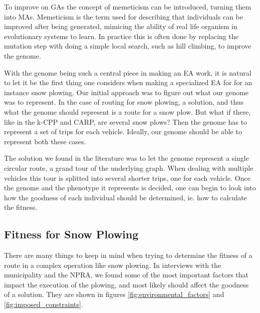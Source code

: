To improve on GAs the concept of memeticism can be introduced, turning them into MAs. Memeticism is the term used for describing that individuals can be improved after being generated, mimicing the ability of real life organism in evolutionary systems to learn. In practice this is often done by replacing the mutation step with doing a simple local search, such as hill climbing, to improve the genome.

With the genome being such a central piece in making an EA work, it is natural to let it be the first thing one considers when making a specialized EA for for an instance snow plowing. Our initial approach was to figure out what our genome was to represent. In the case of routing for snow plowing, a solution, and thus what the genome should represent is a route for a snow plow. But what if there, like in the k-CPP and CARP, are several snow plows? Then the genome has to represent a set of trips for each vehicle. Ideally, our genome should be able to represent both these cases.

The solution we found in the literature was to let the genome represent a single circular route, a grand tour of the underlying graph. When dealing with multiple vehicles this tour is splitted into several shorter trips, one for each vehicle. Once the genome and the phenotype it represents is decided, one can begin to look into how the goodness of each individual should be determined, ie. how to calculate the fitness.



\subsection{Fitness for Snow Plowing} %
\label{sub:fitness_for_snow_plowing}

There are many things to keep in mind when trying to determine the fitness of a route in a complex operation like snow plowing. In interviews with the municipality and the NPRA, we found some of the most important factors that impact the execution of the plowing, and most likely should affect the goodness of a solution. They are shown in figures \ref{fig:environmental_factors} and \ref{fig:imposed_constraints}.


